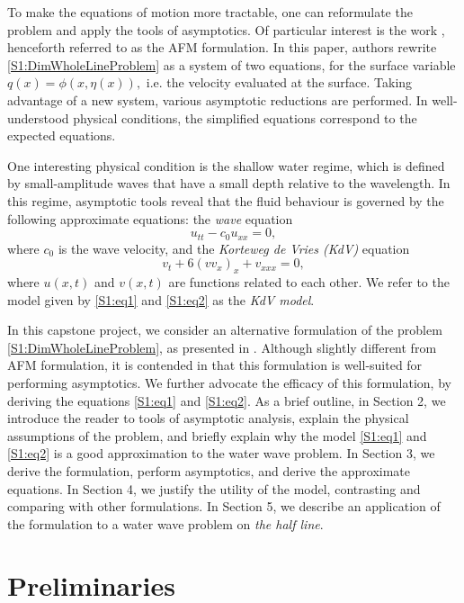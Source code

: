 \documentclass[11pt,reqno,oneside,a4paper]{article}
\begin{document}
To make the equations of motion more tractable, one can reformulate the problem and apply the tools of asymptotics. Of particular interest is the work \cite{AFM2006}, henceforth referred to as the AFM formulation. In this paper, authors rewrite \eqref{S1:DimWholeLineProblem} as a system of two equations, for the surface variable $q(x) = \phi(x, \eta(x)),$ i.e. the velocity evaluated at the surface. Taking advantage of a new system, various asymptotic reductions are performed. In well-understood physical conditions, the simplified equations correspond to the expected equations.

One interesting physical condition is the shallow water regime, which is defined by small-amplitude waves that have a small depth relative to the wavelength. In this regime, asymptotic tools reveal that the fluid behaviour is governed by the following approximate equations: the \textit{wave} equation
\begin{equation}\label{S1:eq1}
u_{tt} - c_0 u_{xx} = 0,
\end{equation} 
where $c_0$ is the wave velocity, and the \textit{Korteweg de Vries (KdV)} equation
\begin{equation}\label{S2:eq2}
v_{t} + 6(vv_x)_x + v_{xxx} = 0,
\end{equation}
where $u(x,t)$ and $v(x,t)$ are functions related to each other. We refer to the model given by \eqref{S1:eq1} and \eqref{S1:eq2} as the \textit{KdV model}.

In this capstone project, we consider an alternative formulation of the problem \eqref{S1:DimWholeLineProblem}, as presented in \cite{OV2013}. Although slightly different from AFM formulation, it is contended in \cite{OV2013} that this formulation is well-suited for performing asymptotics. We further advocate the efficacy of this formulation, by deriving the equations \eqref{S1:eq1} and \eqref{S1:eq2}. As a brief outline, in Section 2, we introduce the reader to tools of asymptotic analysis, explain the physical assumptions of the problem, and briefly explain why the model \eqref{S1:eq1} and \eqref{S1:eq2} is a good approximation to the water wave problem. In Section 3, we derive the formulation, perform asymptotics, and derive the approximate equations. In Section 4, we justify the utility of the model, contrasting and comparing with other formulations. In Section 5, we describe an application of the formulation to a water wave problem on \textit{the half line}.

\section{Preliminaries}
\end{document}
